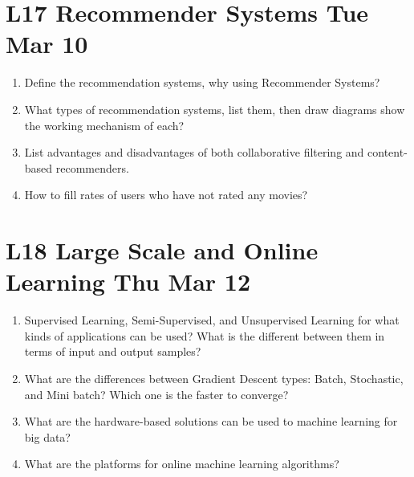 \documentclass[12pt]{article}
\newenvironment{QandA}{\begin{enumerate}[label=\bfseries\arabic*.]\bfseries}
{\end{enumerate}}
\begin{document}
\section*{L17 Recommender Systems \textemdash{} Tue Mar 10}
\begin{QandA}
    \item Define the recommendation systems, why using Recommender Systems?
    
    \item What types of recommendation systems, list them, then draw diagrams show the working mechanism of each?
    
    \item List advantages and disadvantages of both collaborative filtering and content-based recommenders.
    
    \item How to fill rates of users who have not rated any movies?
\end{QandA}

\section*{L18 Large Scale and Online Learning  \textemdash{}Thu Mar 12}
\begin{QandA}
    \item Supervised Learning, Semi-Supervised, and Unsupervised Learning for what kinds of applications can be used? 
          What is the different between them in terms of input and output samples?
    
    \item What are the differences between Gradient Descent types: Batch, Stochastic, and Mini batch? 
          Which one is the faster to converge? 
    
    \item What are the hardware-based solutions can be used to machine learning for big data? 
    
    \item What are the platforms for online machine learning algorithms?

\end{QandA}
\end{document}

